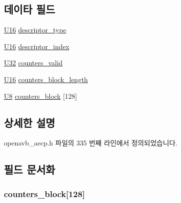 \subsection*{데이타 필드}
\begin{DoxyCompactItemize}
\item 
\hyperlink{openavb__types__base__pub_8h_a0a0a322d5fa4a546d293a77ba8b4a71f}{U16} \hyperlink{structopenavb__aecp__response__data__get__counters__t_a1e231d7874aada5925b29affc76782cc}{descriptor\+\_\+type}
\item 
\hyperlink{openavb__types__base__pub_8h_a0a0a322d5fa4a546d293a77ba8b4a71f}{U16} \hyperlink{structopenavb__aecp__response__data__get__counters__t_ab26fb363c24b9a2a4391f9171c981b08}{descriptor\+\_\+index}
\item 
\hyperlink{openavb__types__base__pub_8h_a696390429f2f3b644bde8d0322a24124}{U32} \hyperlink{structopenavb__aecp__response__data__get__counters__t_a65aa742a6a13f1f3df23d7f0e50901ec}{counters\+\_\+valid}
\item 
\hyperlink{openavb__types__base__pub_8h_a0a0a322d5fa4a546d293a77ba8b4a71f}{U16} \hyperlink{structopenavb__aecp__response__data__get__counters__t_add41dc90d843d833c149849aabdf1b66}{counters\+\_\+block\+\_\+length}
\item 
\hyperlink{openavb__types__base__pub_8h_aa63ef7b996d5487ce35a5a66601f3e73}{U8} \hyperlink{structopenavb__aecp__response__data__get__counters__t_a42270fad37ed864105800158dfdbbf54}{counters\+\_\+block} \mbox{[}128\mbox{]}
\end{DoxyCompactItemize}


\subsection{상세한 설명}


openavb\+\_\+aecp.\+h 파일의 335 번째 라인에서 정의되었습니다.



\subsection{필드 문서화}
\subsubsection[{\texorpdfstring{counters\+\_\+block}{counters_block}}]{ counters\+\_\+block\mbox{[}128\mbox{]}}\hypertarget{structopenavb__aecp__response__data__get__counters__t_a42270fad37ed864105800158dfdbbf54}{}\label{structopenavb__aecp__response__data__get__counters__t_a42270fad37ed864105800158dfdbbf54}


